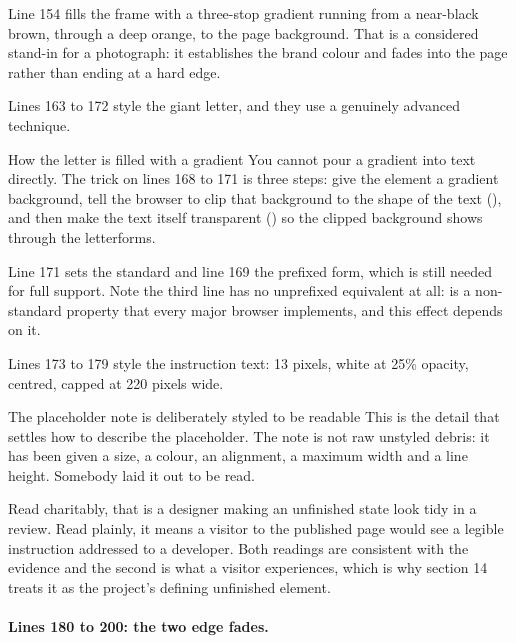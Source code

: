 Line 154 fills the frame with a three-stop gradient running from a near-black
brown, through a deep orange, to the page background. That is a considered stand-in
for a photograph: it establishes the brand colour and fades into the page rather
than ending at a hard edge.

Lines 163 to 172 style the giant letter, and they use a genuinely advanced
technique.

\begin{keyidea}{How the letter is filled with a gradient}
You cannot pour a gradient into text directly. The trick on lines 168 to 171 is
three steps: give the element a gradient background, tell the browser to clip that
background to the shape of the text (), and then make
the text itself transparent () so the
clipped background shows through the letterforms.

Line 171 sets the standard  and line 169 the prefixed
 form, which is still needed for full support. Note the third line
has no unprefixed equivalent at all:  is a
non-standard property that every major browser implements, and this effect depends
on it.
\end{keyidea}

Lines 173 to 179 style the instruction text: 13 pixels, white at 25\% opacity,
centred, capped at 220 pixels wide.

\begin{honest}{The placeholder note is deliberately styled to be readable}
This is the detail that settles how to describe the placeholder. The note is not
raw unstyled debris: it has been given a size, a colour, an alignment, a maximum
width and a line height. Somebody laid it out to be read.

Read charitably, that is a designer making an unfinished state look tidy in a
review. Read plainly, it means a visitor to the published page would see a legible
instruction addressed to a developer. Both readings are consistent with the
evidence and the second is what a visitor experiences, which is why section 14
treats it as the project's defining unfinished element.
\end{honest}

\paragraph{Lines 180 to 200: the two edge fades.}

